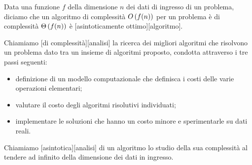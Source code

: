 \begin{Definition}
	Data una funzione $f$ della dimensione $n$ dei dati di ingresso di un problema, diciamo che un algoritmo di complessit\`a $O \left ( f(n) \right )$ per un problema \`e di complessit\`a $\Theta \left ( f(n) \right )$ \`e [asintoticamente ottimo][algoritmo].
\end{Definition}
\begin{Definition}
	Chiamiamo [di complessit\`a][analisi] la ricerca dei migliori algoritmi che risolvono un problema dato tra un insieme di algoritmi proposto, condotta attraverso i tre passi seguenti:
	\begin{itemize}
		\item definizione di un modello computazionale che definisca i costi delle varie operazioni elementari;
		\item valutare il costo degli algoritmi risolutivi individuati;
		\item implementare le soluzioni che hanno un costo minore e sperimentarle su dati reali.
	\end{itemize}
\end{Definition}
\begin{Definition}
	Chiamiamo [asintotica][analisi] di un algoritmo lo studio della sua complessit\`a al tendere ad infinito della dimensione dei dati in ingresso.
\end{Definition}

